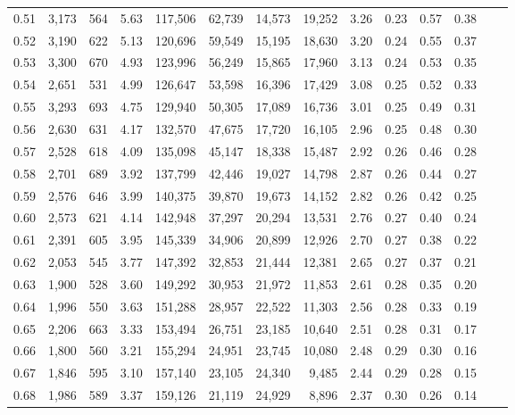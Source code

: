 \begin{tabular}{rrrrrrrrrrrrrr}
0.51 &  3,173 &  564 &    5.63 &  117,506 &   62,739 &  14,573 &  19,252 &  3.26 &  0.23 &  0.57 &      0.38 \\
0.52 &  3,190 &  622 &    5.13 &  120,696 &   59,549 &  15,195 &  18,630 &  3.20 &  0.24 &  0.55 &      0.37 \\
0.53 &  3,300 &  670 &    4.93 &  123,996 &   56,249 &  15,865 &  17,960 &  3.13 &  0.24 &  0.53 &      0.35 \\
0.54 &  2,651 &  531 &    4.99 &  126,647 &   53,598 &  16,396 &  17,429 &  3.08 &  0.25 &  0.52 &      0.33 \\
0.55 &  3,293 &  693 &    4.75 &  129,940 &   50,305 &  17,089 &  16,736 &  3.01 &  0.25 &  0.49 &      0.31 \\
0.56 &  2,630 &  631 &    4.17 &  132,570 &   47,675 &  17,720 &  16,105 &  2.96 &  0.25 &  0.48 &      0.30 \\
0.57 &  2,528 &  618 &    4.09 &  135,098 &   45,147 &  18,338 &  15,487 &  2.92 &  0.26 &  0.46 &      0.28 \\
0.58 &  2,701 &  689 &    3.92 &  137,799 &   42,446 &  19,027 &  14,798 &  2.87 &  0.26 &  0.44 &      0.27 \\
0.59 &  2,576 &  646 &    3.99 &  140,375 &   39,870 &  19,673 &  14,152 &  2.82 &  0.26 &  0.42 &      0.25 \\
0.60 &  2,573 &  621 &    4.14 &  142,948 &   37,297 &  20,294 &  13,531 &  2.76 &  0.27 &  0.40 &      0.24 \\
0.61 &  2,391 &  605 &    3.95 &  145,339 &   34,906 &  20,899 &  12,926 &  2.70 &  0.27 &  0.38 &      0.22 \\
0.62 &  2,053 &  545 &    3.77 &  147,392 &   32,853 &  21,444 &  12,381 &  2.65 &  0.27 &  0.37 &      0.21 \\
0.63 &  1,900 &  528 &    3.60 &  149,292 &   30,953 &  21,972 &  11,853 &  2.61 &  0.28 &  0.35 &      0.20 \\
0.64 &  1,996 &  550 &    3.63 &  151,288 &   28,957 &  22,522 &  11,303 &  2.56 &  0.28 &  0.33 &      0.19 \\
0.65 &  2,206 &  663 &    3.33 &  153,494 &   26,751 &  23,185 &  10,640 &  2.51 &  0.28 &  0.31 &      0.17 \\
0.66 &  1,800 &  560 &    3.21 &  155,294 &   24,951 &  23,745 &  10,080 &  2.48 &  0.29 &  0.30 &      0.16 \\
0.67 &  1,846 &  595 &    3.10 &  157,140 &   23,105 &  24,340 &   9,485 &  2.44 &  0.29 &  0.28 &      0.15 \\
0.68 &  1,986 &  589 &    3.37 &  159,126 &   21,119 &  24,929 &   8,896 &  2.37 &  0.30 &  0.26 &      0.14 \\

\end{tabular}

